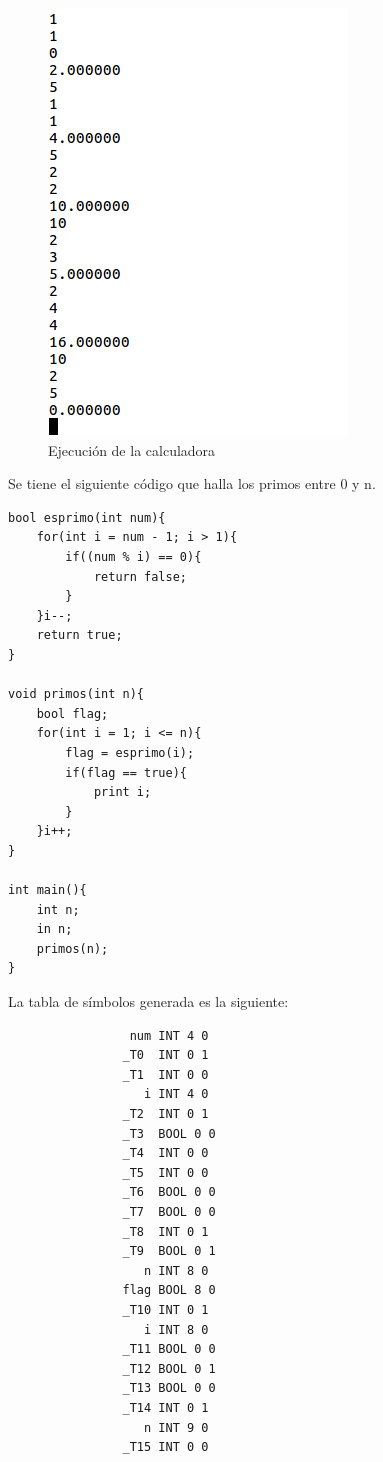 \documentclass[a4paper,12pt]{article}
\begin{document}
\begin{enumerate}
  \begin{figure}[H]
   \centering
   \includegraphics[scale = 0.5]{1.png}
   \caption{Ejecución de la calculadora}
  \end{figure}
  
  Se tiene el siguiente código que halla los primos entre 0 y n.
  
  \begin{lstlisting}
bool esprimo(int num){
	for(int i = num - 1; i > 1){
		if((num % i) == 0){
			return false;
		}
	}i--;
	return true;
}

void primos(int n){
	bool flag;
	for(int i = 1; i <= n){
		flag = esprimo(i);
		if(flag == true){
			print i;
		}
	}i++;
}

int main(){
 	int n;
 	in n;
 	primos(n);
}
  \end{lstlisting}
  
  La tabla de símbolos generada es la siguiente:
  
  \begin{lstlisting}
                 num INT 4 0
                _T0  INT 0 1
                _T1  INT 0 0
                   i INT 4 0
                _T2  INT 0 1
                _T3  BOOL 0 0
                _T4  INT 0 0
                _T5  INT 0 0
                _T6  BOOL 0 0
                _T7  BOOL 0 0
                _T8  INT 0 1
                _T9  BOOL 0 1
                   n INT 8 0
                flag BOOL 8 0
                _T10 INT 0 1
                   i INT 8 0
                _T11 BOOL 0 0
                _T12 BOOL 0 1
                _T13 BOOL 0 0
                _T14 INT 0 1
                   n INT 9 0
                _T15 INT 0 0
  \end{lstlisting}


\end{enumerate}
\end{document}
